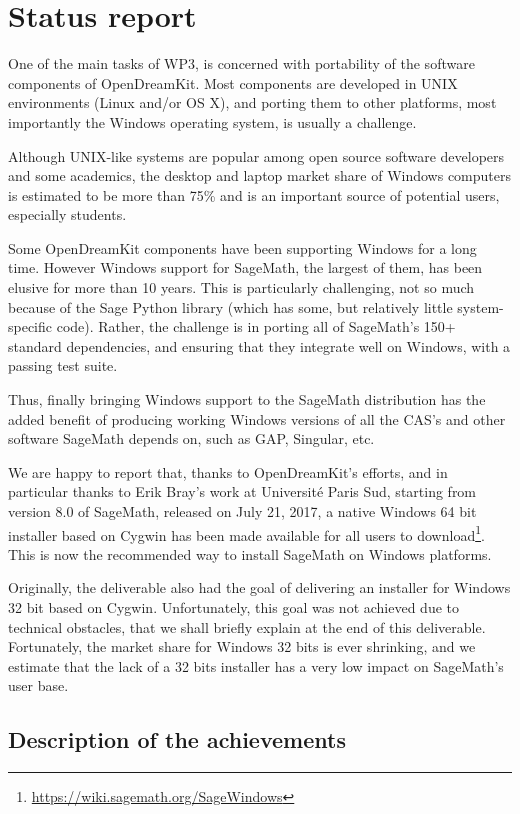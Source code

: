 \hypertarget{status-report}{%
\section{Status report}\label{status-report}}

One of the main tasks of WP3, is concerned with portability of the
software components of OpenDreamKit. Most components are developed in
UNIX environments (Linux and/or OS X), and porting them to other
platforms, most importantly the Windows operating system, is usually a
challenge.

Although UNIX-like systems are popular among open source software
developers and some academics, the desktop and laptop market share of
Windows computers is estimated to be more than 75\% and is an important
source of potential users, especially students.

Some OpenDreamKit components have been supporting Windows for a long
time. However Windows support for SageMath, the largest of them, has
been elusive for more than 10 years. This is particularly challenging,
not so much because of the Sage Python library (which has some, but
relatively little system-specific code). Rather, the challenge is in
porting all of SageMath's 150+ standard dependencies, and ensuring that
they integrate well on Windows, with a passing test suite.

Thus, finally bringing Windows support to the SageMath distribution has
the added benefit of producing working Windows versions of all the CAS's
and other software SageMath depends on, such as GAP, Singular, etc.

We are happy to report that, thanks to OpenDreamKit's efforts, and in
particular thanks to Erik Bray's work at Université Paris Sud, starting
from version 8.0 of SageMath, released on July 21, 2017, a native
Windows 64 bit installer based on Cygwin has been made available for all
users to download\footnote{\url{https://wiki.sagemath.org/SageWindows}}.
This is now the recommended way to install SageMath on Windows
platforms.

Originally, the deliverable also had the goal of delivering an installer
for Windows 32 bit based on Cygwin. Unfortunately, this goal was not
achieved due to technical obstacles, that we shall briefly explain at
the end of this deliverable. Fortunately, the market share for Windows
32 bits is ever shrinking, and we estimate that the lack of a 32 bits
installer has a very low impact on SageMath's user base.

\hypertarget{description-of-the-achievements}{%
\subsection{Description of the
achievements}\label{description-of-the-achievements}}

